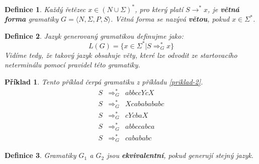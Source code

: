 \documentclass[10pt, a4paper, titlepage]{article}
\theoremstyle{note}
\newtheorem{definice}{Definice}
\newtheorem{priklad}{Příklad}
\begin{document}
\begin{definice}
Každý řetězec $x \in (N \cup\Sigma)^{*}$, pro který platí $S \rightarrow^{*} x$, je \textbf{větná forma} gramatiky $G = \langle N, \Sigma, P, S \rangle$.
Větná forma se nazývá \textbf{větou}, pokud $x \in \Sigma^{*}$.
\end{definice}

\begin{definice}
Jazyk generovaný gramatikou definujme jako:
$$
L(G) = \lbrace x \in \Sigma^{*} | S \Rightarrow_{G}^{*} x \rbrace
$$
Vidíme tedy, že takový jazyk obsahuje \emph{věty}, které lze odvodit ze startovacího neterminálu pomocí pravidel této gramatiky.
\end{definice}

\begin{priklad}
Tento příklad čerpá gramatiku z příkladu \ref{priklad-2}.
\begin{eqnarray*}
S &\Rightarrow_{G}^{*}& abbccYcX \\
S &\Rightarrow_{G}^{*}& Xcababababc \\
S &\Rightarrow_{G}^{*}& cYcbaX \\
S &\Rightarrow_{G}^{*}& abbccabca \\
S &\Rightarrow_{G}^{*}& cabababc
\end{eqnarray*}
\end{priklad}

\begin{definice}
Gramatiky $G_{1}$ a $G_{2}$ jsou \textbf{ekvivalentní}, pokud generují stejný jazyk.
\end{definice}
\end{document}
